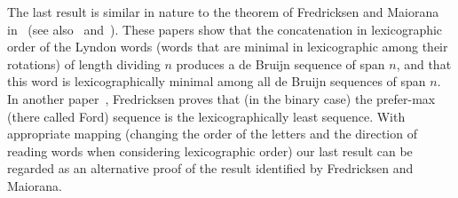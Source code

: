 \documentclass{article}
\theoremstyle{definition}
\begin{document}
The last result is similar in nature to the theorem of Fredricksen and Maiorana in~\cite{Fredricksen1978} (see also~\cite{Moreno2004} and~\cite{Moreno2015}).	
These papers show that the concatenation in lexicographic order of the Lyndon words (words that are minimal in lexicographic among their rotations) of length dividing $n$ produces a de Bruijn sequence of span $n$, and that this word is lexicographically minimal among all de Bruijn sequences of span $n$. In another paper~\cite{Fredricksen1970}, Fredricksen proves that (in the binary case) the prefer-max (there called Ford) sequence is the lexicographically least sequence. With appropriate mapping (changing the order of the letters and the direction of reading words when considering lexicographic order) our last result can be regarded as an alternative proof of the result identified by Fredricksen and Maiorana.


{}

\end{document}
